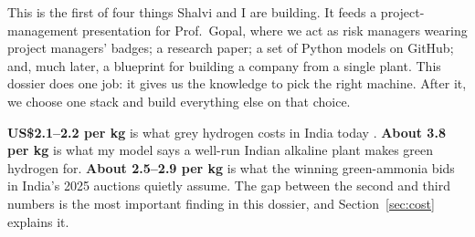 This is the first of four things Shalvi and I are building. It feeds a project-management presentation for Prof.\ Gopal, where we act as risk managers wearing project managers' badges; a research paper; a set of Python models on GitHub; and, much later, a blueprint for building a company from a single plant. This dossier does one job: it gives us the knowledge to pick the right machine. After it, we choose one stack and build everything else on that choice.

\vspace{4pt}

\vspace{6pt}
\begin{plainwords}
\textbf{US\$2.1–2.2 per kg} is what grey hydrogen costs in India today \cite{jmkiocl2025,tribune2025}. \textbf{About \usd{}3.8 per kg} is what my model says a well-run Indian alkaline plant makes green hydrogen for. \textbf{About \usd{}2.5–2.9 per kg} is what the winning green-ammonia bids in India's 2025 auctions quietly assume. The gap between the second and third numbers is the most important finding in this dossier, and Section~\ref{sec:cost} explains it.
\end{plainwords}

\newpage

